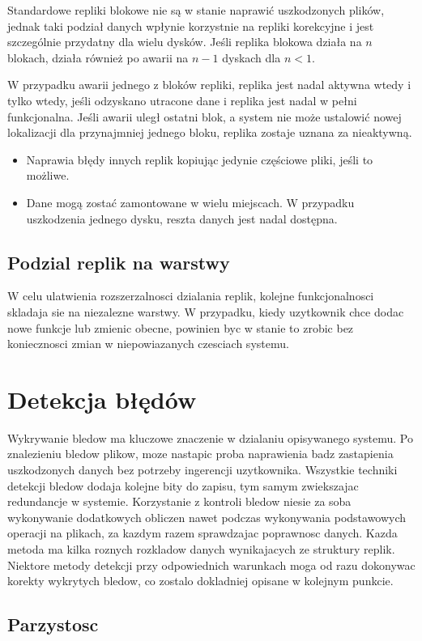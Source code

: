 Standardowe repliki blokowe nie są w stanie naprawić uszkodzonych plików, jednak taki podział danych wpłynie korzystnie na repliki korekcyjne i jest szczególnie przydatny dla wielu dysków. Jeśli replika blokowa działa na $n$ blokach, działa również po awarii na $n-1$ dyskach dla $n < 1$.

W przypadku awarii jednego z bloków repliki, replika jest nadal aktywna wtedy i tylko wtedy, jeśli odzyskano utracone dane i replika jest nadal w pełni funkcjonalna. Jeśli awarii uległ ostatni blok, a system nie może ustalowić nowej lokalizacji dla przynajmniej jednego bloku, replika zostaje uznana za nieaktywną.
\begin{itemize}
    \item Naprawia błędy innych replik kopiując jedynie częściowe pliki, jeśli to możliwe.
    \item Dane mogą zostać zamontowane w wielu miejscach. W przypadku uszkodzenia jednego dysku, reszta danych jest nadal dostępna.
\end{itemize}

\subsection{Podzial replik na warstwy}
W celu ulatwienia rozszerzalnosci dzialania replik, kolejne funkcjonalnosci skladaja sie na niezalezne warstwy. W przypadku, kiedy uzytkownik chce dodac nowe funkcje lub zmienic obecne, powinien byc w stanie to zrobic bez koniecznosci zmian w niepowiazanych czesciach systemu.


\section {Detekcja błędów}
    Wykrywanie bledow ma kluczowe znaczenie w dzialaniu opisywanego systemu. Po znalezieniu bledow plikow, moze nastapic proba naprawienia badz zastapienia uszkodzonych danych bez potrzeby ingerencji uzytkownika. Wszystkie techniki detekcji bledow dodaja kolejne bity do zapisu, tym samym zwiekszajac redundancje w systemie. Korzystanie z kontroli bledow niesie za soba wykonywanie dodatkowych obliczen nawet podczas wykonywania podstawowych operacji na plikach, za kazdym razem sprawdzajac poprawnosc danych. Kazda metoda ma kilka roznych rozkladow danych wynikajacych ze struktury replik. Niektore metody detekcji przy odpowiednich warunkach moga od razu dokonywac korekty wykrytych bledow, co zostalo dokladniej opisane w kolejnym punkcie.
\subsection{Parzystosc}
